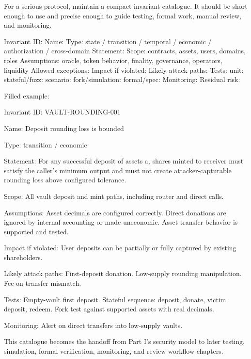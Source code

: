 For a serious protocol, maintain a compact invariant catalogue. It should be short enough to use and precise enough to guide testing, formal work, manual review, and monitoring.

\begin{codeblock}
Invariant ID:
Name:
Type:
    state / transition / temporal / economic / authorization / cross-domain
Statement:
Scope:
    contracts, assets, users, domains, roles
Assumptions:
    oracle, token behavior, finality, governance, operators, liquidity
Allowed exceptions:
Impact if violated:
Likely attack paths:
Tests:
    unit:
    stateful/fuzz:
    scenario:
    fork/simulation:
    formal/spec:
Monitoring:
Residual risk:
\end{codeblock}

Filled example:

\begin{codeblock}
Invariant ID:
    VAULT-ROUNDING-001

Name:
    Deposit rounding loss is bounded

Type:
    transition / economic

Statement:
    For any successful deposit of assets a, shares minted to receiver
    must satisfy the caller's minimum output and must not create
    attacker-capturable rounding loss above configured tolerance.

Scope:
    All vault deposit and mint paths, including router and direct calls.

Assumptions:
    Asset decimals are configured correctly.
    Direct donations are ignored by internal accounting or made uneconomic.
    Asset transfer behavior is supported and tested.

Impact if violated:
    User deposits can be partially or fully captured by existing shareholders.

Likely attack paths:
    First-deposit donation.
    Low-supply rounding manipulation.
    Fee-on-transfer mismatch.

Tests:
    Empty-vault first deposit.
    Stateful sequence: deposit, donate, victim deposit, redeem.
    Fork test against supported assets with real decimals.

Monitoring:
    Alert on direct transfers into low-supply vaults.
\end{codeblock}

This catalogue becomes the handoff from Part I's security model to later testing, simulation, formal verification, monitoring, and review-workflow chapters.


